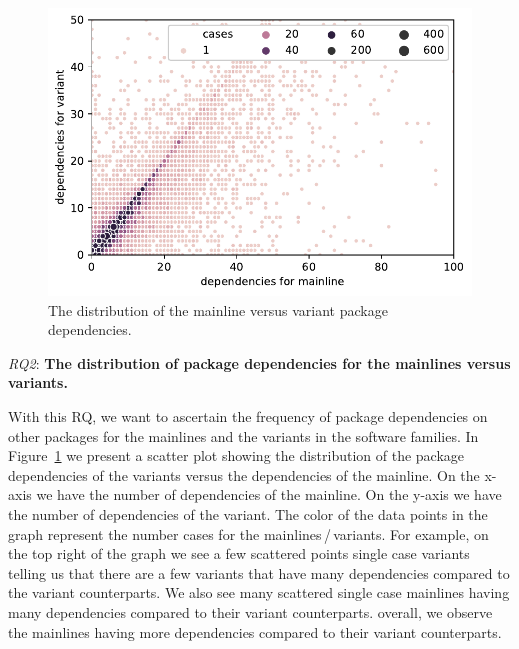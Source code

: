 \begin{figure}[htbp]
\vspace{-.3cm}
   \centering
    \includegraphics[scale=0.6]{figures/benevolj_dependencies.pdf}
    \caption{The distribution of the mainline versus variant package dependencies.}
    \label{fig:dependencies}
\end{figure}


\textit{RQ2}: \textbf{The distribution of package dependencies for the mainlines versus variants.}

With this RQ, we want to ascertain the frequency of package dependencies on other packages for the mainlines and the variants in the software families. 
In Figure~\ref{fig:dependencies} we present a scatter plot showing the distribution of the package dependencies of the variants versus the dependencies of the mainline.
On the x-axis we have the number of dependencies of the mainline. 
On the y-axis we have the number of dependencies of the variant.
The color of the data points in the graph represent the number cases for the mainlines\,/\,variants.
For example, on the top right of the graph we see a few scattered points single case variants telling us that there are a few variants that have many dependencies compared to the variant counterparts.
We also see many scattered single case mainlines having many dependencies compared to their variant counterparts. 
overall, we observe the mainlines having more dependencies compared to their variant counterparts.

